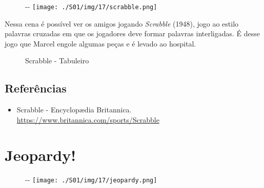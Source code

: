 \begin{figure}[!ht]
  \begin{adjustwidth}{-\oddsidemargin-1in}{-\rightmargin}
    \centering
    \texttt{[image: ./S01/img/17/scrabble.png]}
  \end{adjustwidth}
\end{figure}

Nessa cena é possível ver os amigos jogando \emph{Scrabble} (1948), jogo
ao estilo palavras cruzadas em que os jogadores deve formar palavras
interligadas. É desse jogo que Marcel engole algumas peças e é levado ao
hospital.

\begin{figure}
  \centering
    \caption{Scrabble - Tabuleiro\label{fig:scrabble-tabuleiro}}
\end{figure}

\hypertarget{referuxeancias-4}{%
\subsection{Referências}\label{referuxeancias-4}}

\begin{itemize}
\tightlist
\item
  \sloppy Scrabble - Encyclopædia Britannica. \url{https://www.britannica.com/sports/Scrabble}
\end{itemize}

\hypertarget{jeopardy}{%
\section{Jeopardy!}\label{jeopardy}}

\begin{figure}[!ht]
  \begin{adjustwidth}{-\oddsidemargin-1in}{-\rightmargin}
    \centering
    \texttt{[image: ./S01/img/17/jeopardy.png]}
  \end{adjustwidth}
\end{figure}


